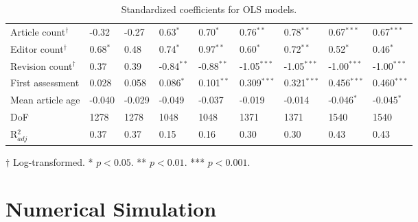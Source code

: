 \documentclass[10pt,twocolumn]{article}
\newcommand{\+}{\phantom{-}}
\begin{document}
\begin{table*}
\begin{tabular}{lllllllll}
Article count$^\dagger$        &  -0.32          & -0.27          
                               & \+0.63${^*}$    & \+0.70${^*}$ 
                               & \+0.76$^{**}$   & \+0.78$^{**}$
                               & \+0.67$^{***}$  & \+0.67$^{***}$ \\
Editor count$^\dagger$         & \+0.68$^{*}$    & \+0.48         
                               & \+0.74$^{*}$    & \+0.97$^{**}$
                               & \+0.60$^{*}$    & \+0.72$^{**}$
                               & \+0.52$^{*}$    & \+0.46$^{*}$ \\
Revision count$^\dagger$       & \+0.37          & \+0.39         
                               &  -0.84$^{**}$   & -0.88$^{**}$
                               &  -1.05$^{***}$  & -1.05$^{***}$
                               &  -1.00$^{***}$  & -1.00$^{***}$ \\
First assessment               & \+0.028         & \+0.058        
                               & \+0.086$^{*}$   & \+0.101$^{**}$
                               & \+0.309$^{***}$ & \+0.321$^{***}$
                               & \+0.456$^{***}$ & \+0.460$^{***}$ \\
Mean article age               &  -0.040         & -0.029         
                               &  -0.049         & -0.037
                               &  -0.019         & -0.014
                               &  -0.046$^{*}$   & -0.045$^{*}$ \\
\hline
DoF                            & 1278            & 1278          
                               & 1048            & 1048
                               & 1371            & 1371
                               & 1540            & 1540 \\
R$^2_{adj}$                    & 0.37            & 0.37          
                               & 0.15            & 0.16
                               & 0.30            & 0.30
                               & 0.43            & 0.43 \\
\end{tabular}
\caption{Standardized coefficients for OLS models.
\label{tab:model}
}
\begin{tablenotes}
\item $\dagger$ Log-transformed. * $p < 0.05$. ** $p < 0.01$. *** $p < 0.001$.
\end{tablenotes}
\end{table*}

\section{Numerical Simulation}
\end{document}
